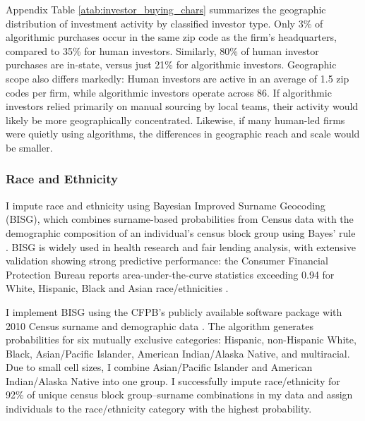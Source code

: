 \documentclass[11pt]{article}
\begin{document}
Appendix Table \ref{atab:investor_buying_chars} summarizes the geographic distribution of investment activity by classified investor type. Only 3\% of algorithmic purchases occur in the same zip code as the firm’s headquarters, compared to 35\% for human investors. Similarly, 80\% of human investor purchases are in-state, versus just 21\% for algorithmic investors. Geographic scope also differs markedly: Human investors are active in an average of 1.5 zip codes per firm, while algorithmic investors operate across 86. If algorithmic investors relied primarily on manual sourcing by local teams, their activity would likely be more geographically concentrated. Likewise, if many human-led firms were quietly using algorithms, the differences in geographic reach and scale would be smaller. 


\subsubsection{Race and Ethnicity}\label{sec:data:race}

I impute race and ethnicity using Bayesian Improved Surname Geocoding (BISG), which combines surname-based probabilities from Census data with the demographic composition of an individual's census block group using Bayes' rule \citep{elliottUsingCensusBureau2009}. BISG is widely used in health research and fair lending analysis, with extensive validation showing strong predictive performance: the Consumer Financial Protection Bureau reports area-under-the-curve statistics exceeding 0.94 for White, Hispanic, Black and Asian race/ethnicities \citep{consumer_financial_protection_bureau_using_2014}. 

I implement BISG using the CFPB's publicly available software package with 2010 Census surname and demographic data \citep{cfpbproxy-methodology_2025}. The algorithm generates probabilities for six mutually exclusive categories: Hispanic, non-Hispanic White, Black, Asian/Pacific Islander, American Indian/Alaska Native, and multiracial. Due to small cell sizes, I combine Asian/Pacific Islander and American Indian/Alaska Native into one group. I successfully impute race/ethnicity for 92\% of unique census block group--surname combinations in my data and assign individuals to the race/ethnicity category with the highest probability. 
\end{document}

